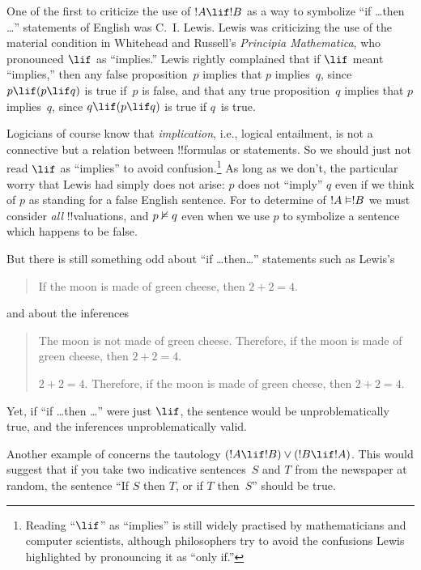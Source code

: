 \documentclass[../../../include/open-logic-section]{subfiles}
\begin{document}


One of the first to criticize the use of $!A \lif !B$ as a way to
symbolize ``if \dots then \dots'' statements of English was
C.~I. Lewis. Lewis was criticizing the use of the material condition
in Whitehead and Russell's \emph{Principia Mathematica}, who
pronounced $\lif$ as ``implies.''  Lewis rightly complained that if
$\lif$ meant ``implies,'' then any false proposition~$p$ implies that
$p$ implies~$q$, since $p \lif (p \lif q)$ is true if~$p$ is false,
and that any true proposition~$q$ implies that $p$ implies~$q$, since
$q \lif (p \lif q)$ is true if $q$~is true.

Logicians of course know that \emph{implication}, i.e., logical
entailment, is not a connective but a relation between !!{formula}s or
statements. So we should just not read $\lif$ as ``implies'' to avoid
confusion.\footnote{Reading ``$\lif$'' as ``implies'' is still widely
  practised by mathematicians and computer scientists, although
  philosophers try to avoid the confusions Lewis highlighted by
  pronouncing it as ``only if.''} As long as we don't, the particular
worry that Lewis had simply does not arise: $p$ does not ``imply'' $q$
even if we think of $p$ as standing for a false English sentence. For
to determine of $!A \Entails !B$ we must consider \emph{all}
!!{valuation}s, and $p \Entails/ q$ even when we use $p$ to symbolize
a sentence which happens to be false.

But there is still something odd about ``if \dots then\dots''
statements such as Lewis's
\begin{quote}
If the moon is made of green cheese, then $2+2=4$.
\end{quote}
and about the inferences
\begin{quote}
  The moon is not made of green cheese. Therefore, if the moon is made
  of green cheese, then $2+2=4$.

  $2+2 = 4$. Therefore, if the moon is made
  of green cheese, then $2+2=4$.
\end{quote}
Yet, if ``if \dots then \dots'' were just $\lif$, the sentence would
be unproblematically true, and the inferences unproblematically valid.

Another example of concerns the tautology $(!A \lif !B) \lor (!B \lif
!A)$.  This would suggest that if you take two indicative
sentences~$S$ and $T$ from the newspaper at random, the sentence ``If
$S$ then $T$, or if $T$ then~$S$'' should be true.
\end{document}

